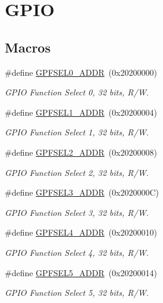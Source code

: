 \hypertarget{group__GPIO}{}\section{G\+P\+IO}
\label{group__GPIO}
\subsection*{Macros}
\begin{DoxyCompactItemize}
\item 
\#define \hyperlink{group__GPIO_ga0c3df699cdf9e7fae6f2555192c53b94}{G\+P\+F\+S\+E\+L0\+\_\+\+A\+D\+DR}~(0x20200000)
\begin{DoxyCompactList}\small\item\em G\+P\+IO Function Select 0, 32 bits, R/W. \end{DoxyCompactList}\item 
\#define \hyperlink{group__GPIO_ga1e43ad10c82761bf4a40d368efc4dbe4}{G\+P\+F\+S\+E\+L1\+\_\+\+A\+D\+DR}~(0x20200004)
\begin{DoxyCompactList}\small\item\em G\+P\+IO Function Select 1, 32 bits, R/W. \end{DoxyCompactList}\item 
\#define \hyperlink{group__GPIO_gaae4e338408363b99970dbb5ca4f525f2}{G\+P\+F\+S\+E\+L2\+\_\+\+A\+D\+DR}~(0x20200008)
\begin{DoxyCompactList}\small\item\em G\+P\+IO Function Select 2, 32 bits, R/W. \end{DoxyCompactList}\item 
\#define \hyperlink{group__GPIO_ga41a15defd3f0e50bc1d3f25138795670}{G\+P\+F\+S\+E\+L3\+\_\+\+A\+D\+DR}~(0x2020000\+C)
\begin{DoxyCompactList}\small\item\em G\+P\+IO Function Select 3, 32 bits, R/W. \end{DoxyCompactList}\item 
\#define \hyperlink{group__GPIO_gaa56d5af814f15c4732f421b4930ecf11}{G\+P\+F\+S\+E\+L4\+\_\+\+A\+D\+DR}~(0x20200010)
\begin{DoxyCompactList}\small\item\em G\+P\+IO Function Select 4, 32 bits, R/W. \end{DoxyCompactList}\item 
\#define \hyperlink{group__GPIO_ga3ac1e9f2459cc9bee9e9beea554c7717}{G\+P\+F\+S\+E\+L5\+\_\+\+A\+D\+DR}~(0x20200014)
\begin{DoxyCompactList}\small\item\em G\+P\+IO Function Select 5, 32 bits, R/W. \end{DoxyCompactList}\item 

\end{DoxyCompactItemize}

